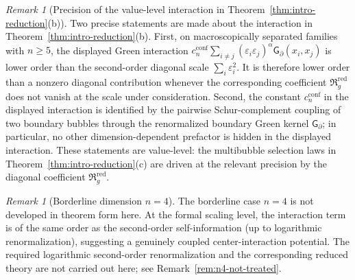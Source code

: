 \documentclass[11pt,reqno,a4paper]{amsart}
\numberwithin{equation}{section}
\theoremstyle{plain}
\theoremstyle{remark}
\newtheorem{remark}[theorem]{Remark}
\theoremstyle{plain}
\begin{document}
\begin{remark}[Precision of the value-level interaction in Theorem~\ref{thm:intro-reduction}\textup{(b)}]
\label{rem:intro-interaction-precision}
Two precise statements are made about the interaction in
Theorem~\ref{thm:intro-reduction}\textup{(b)}.  First, on macroscopically separated families with $n\ge5$,
the displayed Green interaction
$c_n^{\mathrm{conf}}\sum_{i\ne j}(\varepsilon_i\varepsilon_j)^\alpha
\mathsf G_\partial(x_i,x_j)$ is lower order than the second-order diagonal scale
$\sum_i\varepsilon_i^2$.  It is therefore lower order than a nonzero diagonal contribution whenever the
corresponding coefficient $\mathfrak R_g^{\mathrm{red}}$ does not vanish at the scale under consideration. Second, the constant
$c_n^{\mathrm{conf}}$ in the displayed interaction is identified by the pairwise Schur-complement coupling of
two boundary bubbles through the renormalized boundary Green kernel $\mathsf G_\partial$; in particular, no
other dimension-dependent prefactor is hidden in the displayed interaction.  These statements are value-level:
the multibubble selection laws in Theorem~\ref{thm:intro-reduction}\textup{(c)} are driven at the relevant
precision by the diagonal coefficient $\mathfrak R_g^{\mathrm{red}}$.
\end{remark}

\begin{remark}[Borderline dimension $n=4$]\label{rem:intro-reduction-n4}
The borderline case $n=4$ is not developed in theorem form here.
At the formal scaling level, the interaction term is of the same order as the second-order self-information
(up to logarithmic renormalization), suggesting a genuinely coupled center-interaction potential.
The required logarithmic second-order renormalization and the corresponding reduced theory
are not carried out here; see Remark~\ref{rem:n4-not-treated}.
\end{remark}
\end{document}
